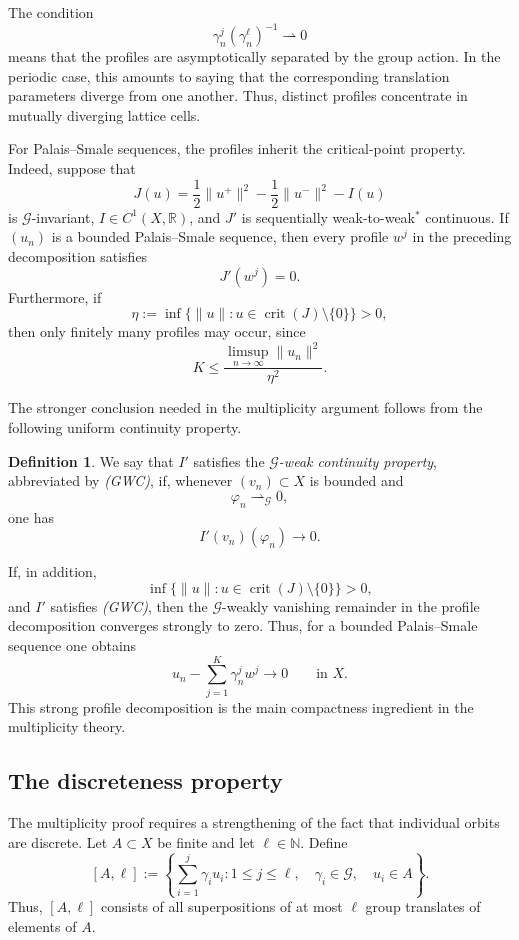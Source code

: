\documentclass[11pt]{amsart}
\numberwithin{equation}{section}
\theoremstyle{definition}
\newtheorem{definition}[theorem]{Definition}
\newcommand{\R}{\mathbb{R}}
\newcommand{\N}{\mathbb{N}}
\newcommand{\cG}{\mathcal{G}}
\newcommand{\crit}{\operatorname{crit}}
\begin{document}
The condition
\[
\gamma_n^j(\gamma_n^\ell)^{-1}\rightharpoonup0
\]
means that the profiles are asymptotically separated by the group action.
In the periodic case, this amounts to saying that the corresponding
translation parameters diverge from one another. Thus, distinct profiles
concentrate in mutually diverging lattice cells.

For Palais--Smale sequences, the profiles inherit the critical-point
property. Indeed, suppose that
\[
J(u)
=
\frac12\|u^+\|^2
-
\frac12\|u^-\|^2
-
I(u)
\]
is $\cG$-invariant, $I\in C^1(X,\R)$, and $J'$ is sequentially
weak-to-weak$^*$ continuous. If $(u_n)$ is a bounded
Palais--Smale sequence, then every profile $w^j$ in the preceding
decomposition satisfies
\[
J'(w^j)=0.
\]
Furthermore, if
\[
\eta:=
\inf\{\|u\|:u\in\crit(J)\setminus\{0\}\}>0,
\]
then only finitely many profiles may occur, since
\[
K
\leq
\frac{\limsup_{n\to\infty}\|u_n\|^2}{\eta^2}.
\]

The stronger conclusion needed in the multiplicity argument follows from
the following uniform continuity property.

\begin{definition}
We say that $I'$ satisfies the \emph{$\cG$-weak continuity property},
abbreviated by \emph{(GWC)}, if, whenever $(v_n)\subset X$ is bounded and
\[
\varphi_n\rightharpoonup_{\cG}0,
\]
one has
\[
I'(v_n)(\varphi_n)\to0.
\]
\end{definition}

If, in addition,
\[
\inf\{\|u\|:u\in\crit(J)\setminus\{0\}\}>0,
\]
and $I'$ satisfies \emph{(GWC)}, then the $\cG$-weakly vanishing
remainder in the profile decomposition converges strongly to zero. Thus,
for a bounded Palais--Smale sequence one obtains
\[
u_n-\sum_{j=1}^K \gamma_n^j w^j\to0
\qquad\text{in }X.
\]
This strong profile decomposition is the main compactness ingredient in
the multiplicity theory.

\subsection{The discreteness property}

The multiplicity proof requires a strengthening of the fact that individual
orbits are discrete. Let $A\subset X$ be finite and let
$\ell\in\N$. Define
\[
[A,\ell]
:=
\left\{
\sum_{i=1}^j \gamma_i u_i:
1\leq j\leq\ell,\quad
\gamma_i\in\cG,\quad
u_i\in A
\right\}.
\]
Thus, $[A,\ell]$ consists of all superpositions of at most $\ell$ group
translates of elements of $A$.
\end{document}
